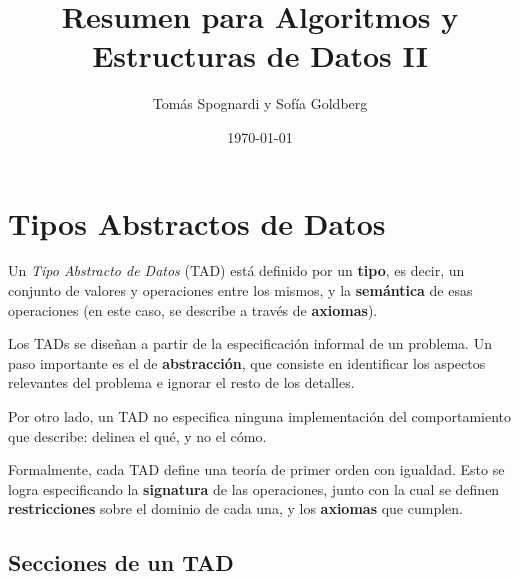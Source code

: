 \documentclass{article}
\title{Resumen para Algoritmos y Estructuras de Datos II}
\author{Tomás Spognardi y Sofía Goldberg}
\date{\today}
\begin{document}
\maketitle

\tableofcontents

\newpage

\section{Tipos Abstractos de Datos}

Un \textit{Tipo Abstracto de Datos} (TAD) está definido por un \textbf{tipo}, es decir, un conjunto de valores y operaciones entre los mismos, y la \textbf{semántica} de esas operaciones (en este caso, se describe a través de \textbf{axiomas}).

Los TADs se diseñan a partir de la especificación informal de un problema. Un paso importante es el de \textbf{abstracción}, que consiste en identificar los aspectos relevantes del problema e ignorar el resto de los detalles.

Por otro lado, un TAD no especifica ninguna implementación del comportamiento que describe: delinea el qué, y no el cómo.

Formalmente, cada TAD define una teoría de primer orden con igualdad. Esto se logra especificando la \textbf{signatura} de las operaciones, junto con la cual se definen \textbf{restricciones} sobre el dominio de cada una, y los \textbf{axiomas} que cumplen.

\subsection{Secciones de un TAD}
\end{document}
